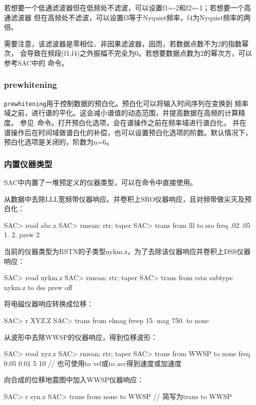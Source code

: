 若想要一个低通滤波器但在低频处不滤波，可以设置f1=-2和f2=-1；若想要一个高通滤波器
但在高频处不滤波，可以设置f3等于Nyquist频率，f4为Nyquist频率的两倍。

需要注意，该滤波器是零相位、非因果滤波器，因而，若数据点数不为2的指数幂次，
会导致在频段(f1,f4)之外振幅不完全为0。若想要数据点数为2的幂次方，可以参考SAC中的
命令。

\subsubsection{prewhitening}
\verb+prewhitening+用于控制数据的预白化。预白化可以将输入时间序列在变换到
频率域之前，进行谱的平化。这会减小谱值的动态范围，并提高数据在高频的计算精度。
参见~命令。打开预白化选项，会在谱操作之前在频率域进行谱白化，
并在谱操作后在时间域做谱白化的补偿，也可以设置预白化选项的阶数。默认情况下，
预白化选项是关闭的，阶数为n=6。

\subsubsection{内置仪器类型}
SAC中内置了一堆预定义的仪器类型，可以在命令中直接使用。

从数据中去除LLL宽频带仪器响应。并卷积上SRO仪器响应，且对频带做尖灭及预白化：
\begin{SACCode}
SAC> read abc.z
SAC> rmean; rtr; taper
SAC> trans from lll to sro freq .02 .05 1. 2. prew 2
\end{SACCode}

当前的仪器类型为RSTN的子类型nykm.z，为了去除该仪器响应并卷积上DSS仪器响应：
\begin{SACCode}
SAC> read nykm.z
SAC> rmean; rtr; taper
SAC> trans from rstn subtype nykm.z to dss prew off
\end{SACCode}

将电磁仪器响应转换成位移：
\begin{SACCode}
SAC> r XYZ.Z
SAC> trans from elmag freep 15. mag 750. to none
\end{SACCode}

从波形中去除WWSP的仪器响应，得到位移波形：
\begin{SACCode}
SAC> read xyz.z
SAC> rmean; rtr; taper
SAC> trans from WWSP to none freq 0.05 0.01 5 10
                // 也可使用to vel或to acc得到速度或加速度
\end{SACCode}

向合成的位移地震图中加入WWSP仪器响应：
\begin{SACCode}
SAC> r syn.z
SAC> trans from none to WWSP    // 简写为trans to WWSP
\end{SACCode}

